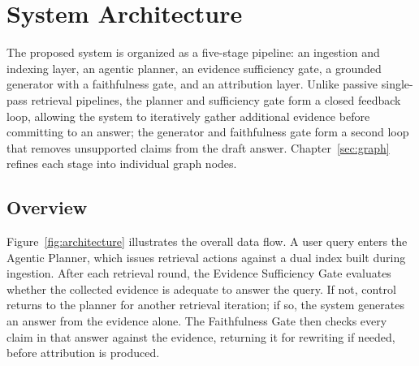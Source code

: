 \chapter{System Architecture}
\label{sec:architecture}

The proposed system is organized as a five-stage pipeline: an ingestion and indexing layer, an agentic planner, an evidence sufficiency gate, a grounded generator with a faithfulness gate, and an attribution layer. Unlike passive single-pass retrieval pipelines, the planner and sufficiency gate form a closed feedback loop, allowing the system to iteratively gather additional evidence before committing to an answer; the generator and faithfulness gate form a second loop that removes unsupported claims from the draft answer. Chapter~\ref{sec:graph} refines each stage into individual graph nodes.

\section{Overview}
Figure~\ref{fig:architecture} illustrates the overall data flow. A user query enters the Agentic Planner, which issues retrieval actions against a dual index built during ingestion. After each retrieval round, the Evidence Sufficiency Gate evaluates whether the collected evidence is adequate to answer the query. If not, control returns to the planner for another retrieval iteration; if so, the system generates an answer from the evidence alone. The Faithfulness Gate then checks every claim in that answer against the evidence, returning it for rewriting if needed, before attribution is produced.

